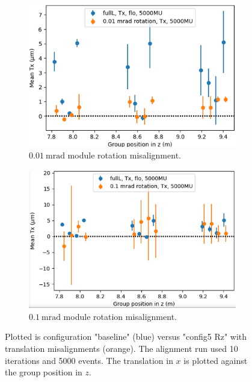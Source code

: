 \begin{figure}
  \centering
  \begin{subfigure}[b]{0.48\textwidth}
    \centering
    \includegraphics[width=\textwidth]{plots/misalign_rota/001_rot_Tx.png}
    \caption{$\SI{0.01}{\milli\radian}$ module rotation misalignment.}
    \label{fig:001Tx}
  \end{subfigure}
  \hfill
  \begin{subfigure}[b]{0.48\textwidth}
    \centering
    \includegraphics[width=\textwidth]{plots/misalign_rota/01_rot_Tx.png}
    \caption{$\SI{0.1}{\milli\radian}$ module rotation misalignment.}
    \label{fig:01Tx}
  \end{subfigure}
  \caption{Plotted is configuration "baseline" (blue) versus "config5 Rz" with translation misalignments (orange). The alignment run used 10 iterations and 5000 events. The translation in $x$ is plotted against the group position in $z$.}
  \label{fig:mis_rot_Tx}
\end{figure}

